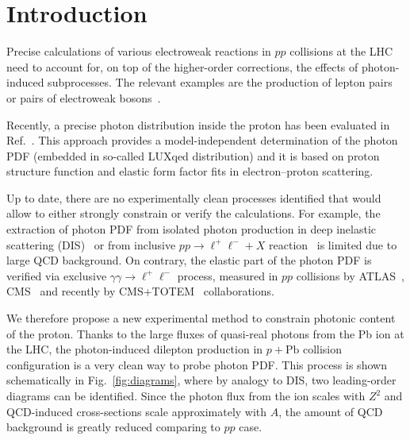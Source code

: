\section{Introduction}

Precise calculations of various electroweak reactions in $pp$ collisions at the LHC need to account for, on top of the higher-order corrections, the effects of photon-induced subprocesses.
The relevant examples are the production of lepton pairs~\cite{Aad:2014qja, Aad:2016zzw,Accomando:2016tah, Luszczak:2015aoa, Harland-Lang:2016apc} or pairs of electroweak bosons~\cite{Luszczak:2014mta, Denner:2015fca, Dyndal:2015hrp, Ababekri:2016kkj, Biedermann:2016guo, Biedermann:2016yvs, Yong:2016njr, Luszczak:2018ntp}.


Recently, a precise photon distribution inside the proton has been evaluated in Ref.~\cite{Manohar:2016nzj}.
This approach provides a model-independent determination of the photon PDF (embedded in so-called LUXqed distribution)
and  it is based on proton structure function and elastic form factor fits in electron--proton scattering.

Up to date, there are no experimentally clean processes identified that would allow to either strongly constrain or verify the calculations.
For example, the extraction of photon PDF from isolated photon production in deep inelastic scattering (DIS)~\cite{Schmidt:2015zda} 
or from inclusive $pp\rightarrow\ell^+\ell^-+X$ reaction~\cite{Ball:2013hta, Aad:2016zzw, Giuli:2017oii} is limited due to large QCD background.
On contrary, the elastic part of the photon PDF is verified via exclusive $\gamma\gamma\rightarrow\ell^+\ell^-$ process, measured in $pp$ collisions by ATLAS~\cite{Aad:2015bwa,Aaboud:2017oiq}, CMS~\cite{Chatrchyan:2011ci,Chatrchyan:2012tv} and recently by CMS+TOTEM~\cite{Cms:2018het} collaborations.




We therefore propose a new experimental method to constrain photonic content of the proton.
Thanks to the large fluxes of quasi-real photons from the Pb ion at the LHC, the photon-induced dilepton production in $p+\textrm{Pb}$ collision configuration is a very clean way to probe photon PDF.
This process is shown schematically in Fig.~\ref{fig:diagrams}, where by analogy to DIS, two leading-order diagrams can be identified.
Since the photon flux from the ion scales with $Z^2$ and QCD-induced cross-sections scale approximately with $A$,
the amount of QCD background is greatly reduced comparing to $pp$ case.

